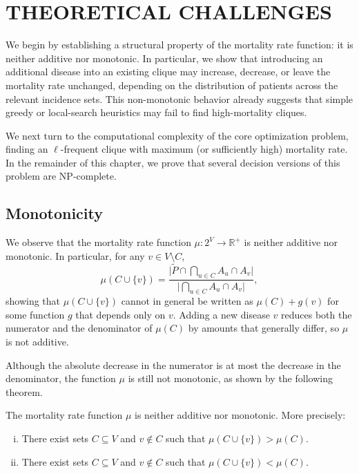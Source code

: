 \begingroup
\clearpage%
\let\clearpage\relax%
\vspace*{-16pt}%
\chapter[THEORETICAL CHALLENGES]{THEORETICAL CHALLENGES}\label{sec.theory}
\endgroup

We begin by establishing a structural property of the mortality rate function: it is neither additive nor monotonic. In particular, we show that introducing an additional disease into an existing clique may increase, decrease, or leave the mortality rate unchanged, depending on the distribution of patients across the relevant incidence sets. This non-monotonic behavior already suggests that simple greedy or local-search heuristics may fail to find high-mortality cliques.

We next turn to the computational complexity of the core optimization problem, finding an $\ell$-frequent clique with maximum (or sufficiently high) mortality rate. In the remainder of this chapter, we prove that several decision versions of this problem are NP-complete.

\section{Monotonicity}

We observe that the mortality rate function $\mu: 2^V \to \mathbb{R}^+$ is neither additive nor monotonic. In particular, for any $v \in V \setminus C$,
\begin{equation}
    \label{eq.addv}
    \mu(C \cup \{v\}) = \frac{\bigl|\widetilde{P} \cap \bigcap_{u \in C} A_u \cap A_v\bigr|}{\bigl|\bigcap_{u \in C} A_u \cap A_v\bigr|},
\end{equation}
showing that $\mu(C \cup \{v\})$ cannot in general be written as $\mu(C) + g(v)$ for some function $g$ that depends only on $v$. Adding a new disease $v$ reduces both the numerator and the denominator of $\mu(C)$ by amounts that generally differ, so $\mu$ is not additive.

Although the absolute decrease in the numerator is at most the decrease in the denominator, the function $\mu$ is still not monotonic, as shown by the following theorem.

\begin{theorem}
    \label{thm.mu-nonmonotonic}
    The mortality rate function $\mu$ is neither additive nor monotonic. More precisely:
    \begin{enumerate}[(i)]
        \item There exist sets $C \subseteq V$ and $v \notin C$ such that $\mu(C \cup \{v\}) > \mu(C)$.
        \item There exist sets $C \subseteq V$ and $v \notin C$ such that $\mu(C \cup \{v\}) < \mu(C)$.
    \end{enumerate}
\end{theorem}


